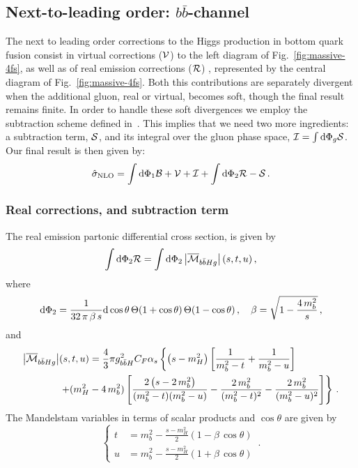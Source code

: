 \subsection{Next-to-leading order: $b\bar{b}$-channel}
The next to leading order corrections to the Higgs production in
bottom quark fusion consist in virtual corrections (${\cal V}$) to the
left diagram of Fig.~\ref{fig:massive-4fs}, as well as of real
emission corrections (${\cal R}$) , represented by the central diagram of
Fig.~\ref{fig:massive-4fs}.
Both this contributions are separately divergent when the additional
gluon, real or virtual, becomes soft, though the final result remains
finite. In order to handle these soft divergences we employ the
subtraction scheme defined in~\cite{Krauss:2017wmx}. This implies that
we need two more ingredients: a subtraction term, ${\cal S}$, and its
integral over the gluon phase space, ${\cal I} = \int{\rm d}\Phi_g{\cal S}$.
Our final result is then given by:
\begin{equation}
  \hat{\sigma}_{\rm NLO} = \int{\rm d}\Phi_1 {\cal B} +{\cal V}+{\cal
    I}+  \int{\rm d}\Phi_2 {\cal R} -{\cal S}\,.
\end{equation}

\subsubsection{Real corrections, and subtraction term}
The real emission partonic differential cross section, is given by
\begin{equation}
 \int {\rm d} \Phi_{2}  {\cal R} =\int {\rm d} \Phi_{2}  \left| \overline{{\cal M}}_{b\bar{b}Hg} \right|(s,t,u)\,,
\end{equation}
where 
\begin{equation}
  {\rm d} \Phi_{2}=\frac{1}{32\,\pi\,\beta\,s} {\rm d}\cos\theta\,
  \Theta(1+\cos\theta )\,\Theta(1-\cos\theta)\, , \quad
  \beta=\sqrt{1-\frac{4\,m_b^2}{s}}\,,
\end{equation}
and
\begin{equation}
  \label{eq:real}
  \begin{split}
    \left| \overline{{\cal M}}_{b\bar{b}Hg} \right|&(s,t,u) = 
    \frac{4}{3}\pi g_{b\bar{b}H}^2C_F\alpha_s
    \left\{
      \left( s-m_H^2\right)\left[ \frac{1}{m_b^2-t}
        + \frac{1}{m_b^2-u}\right]
    \right.\\
    &
    \left.+ (m_H^2-4\,m_b^2)
      \left[
        \frac{2\left( s-2\,m_b^2 \right)}{(m_b^2-t)(m_b^2-u)} -
        \frac{2\,m_b^2}{(m_b^2-t)^2} -
        \frac{2\,m_b^2}{(m_b^2-u)^2}
      \right]
    \right\}\,.
  \end{split}
\end{equation}
The Mandelstam variables in terms of scalar
products and $\cos\theta$ are given by
\begin{equation}
  \left\{
    \begin{split}
      t &= m_b^2 - \frac{s-m_H^2}{2}\left( 1-\beta\,\cos\theta\right)\\
      u &= m_b^2 - \frac{s-m_H^2}{2}\left( 1+\beta\,\cos\theta\right) 
    \end{split}
  \right.\,.
\end{equation}

